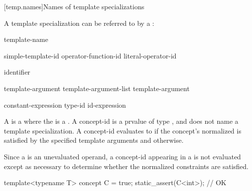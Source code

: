 \documentclass{wg21}
\begin{document}
[temp.names]{Names of template specializations}

\pnum
A template specialization can be referred to by a
:

\begin{bnf}
    \br
    template-name \terminal{<}  \terminal{>}
\end{bnf}

\begin{bnf}
    \br
    simple-template-id\br
    operator-function-id \terminal{<}  \terminal{>}\br
    literal-operator-id \terminal{<}  \terminal{>}
\end{bnf}

\begin{bnf}
    \br
    identifier
\end{bnf}

\begin{bnf}
    \br
    template-argument \br
    template-argument-list \terminal{,} template-argument 
\end{bnf}

\begin{bnf}
    \br
    constant-expression\br
    type-id\br
    id-expression\br
\end{bnf}

\ednote{[...]}

\pnum
A  is a 
where the  is a  .
A concept-id is a prvalue of type , and
does not name a template specialization.
A concept-id evaluates to 
if the concept's
normalized 
is satisfied by the specified template arguments and
 otherwise.
\begin{note}
    Since a  is an unevaluated operand,
    a concept-id appearing in a 
    is not evaluated except as necessary
    to determine whether the normalized constraints are satisfied.
\end{note}
\begin{example}
    \begin{codeblock}
        template<typename T> concept C = true;
        static_assert(C<int>);      // OK
    \end{codeblock}
\end{example}
\end{document}
